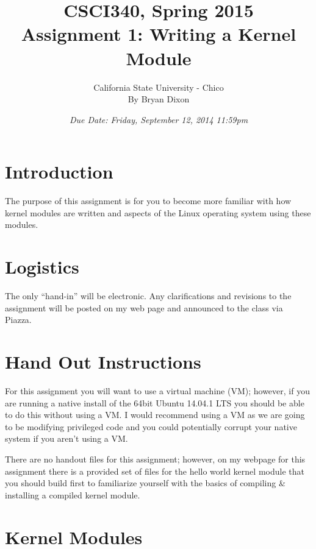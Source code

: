 \documentclass[11pt]{article}
\begin{document}
\title{CSCI340, Spring 2015\\
Assignment 1: Writing a Kernel Module
}

\author{California State University - Chico\\
  By Bryan Dixon\\
}
\date{\emph{Due Date: Friday, September 12, 2014 11:59pm}}


\maketitle

\section*{Introduction}
The purpose of this assignment is for you to become more familiar with how kernel modules are written and aspects of the Linux operating system using these modules. 

\section*{Logistics}

The only ``hand-in'' will be electronic.  Any clarifications and revisions to the assignment will
be posted on my web page and announced to the class via Piazza.

\section*{Hand Out Instructions}

For this assignment you will want to use a virtual machine (VM); however, if you are running a native install of the 64bit Ubuntu 14.04.1 LTS you should be able to do this without using a VM. I would recommend using a VM as we are going to be modifying privileged code and you could potentially corrupt your native system if you aren't using a VM. 

There are no handout files for this assignment; however, on my webpage for this assignment there is a provided set of files for the hello world kernel module that you should build first to familiarize yourself with the basics of compiling \& installing a compiled kernel module. 


\section*{Kernel Modules}
\end{document}
